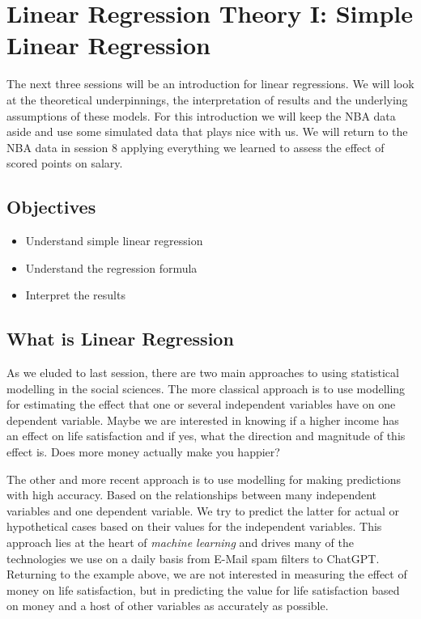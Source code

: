 \documentclass[
]{book}
\providecommand{\tightlist}{%
  \setlength{\itemsep}{0pt}\setlength{\parskip}{0pt}}
\begin{document}
\hypertarget{lin-t-1}{%
\chapter{Linear Regression Theory I: Simple Linear Regression}\label{lin-t-1}}

The next three sessions will be an introduction for linear regressions.
We will look at the theoretical underpinnings, the interpretation of results
and the underlying assumptions of these models. For this introduction we will
keep the NBA data aside and use some simulated data that plays nice with us.
We will return to the NBA data in session 8 applying everything we
learned to assess the effect of scored points on salary.

\hypertarget{objectives-2}{%
\section{Objectives}\label{objectives-2}}

\begin{itemize}
\tightlist
\item
  Understand simple linear regression
\item
  Understand the regression formula
\item
  Interpret the results
\end{itemize}

\hypertarget{what-is-linear-regression}{%
\section{What is Linear Regression}\label{what-is-linear-regression}}

As we eluded to last session, there are two main approaches to using
statistical modelling in the social sciences.
The more classical approach is to use modelling for estimating the effect that
one or several independent variables have on one dependent variable. Maybe we
are interested in knowing if a higher income has an effect on life satisfaction
and if yes, what the direction and magnitude of this effect is. Does more money
actually make you happier?

The other and more recent approach is to use modelling for making predictions
with high accuracy. Based on the relationships between many independent
variables and one dependent variable. We try to predict the latter for actual
or hypothetical cases based on their values for the independent variables.
This approach lies at the heart of \emph{machine learning} and drives many of the
technologies we use on a daily basis from E-Mail spam filters to ChatGPT.
Returning to the example above, we are not interested in measuring the effect
of money on life satisfaction, but in predicting the value for life satisfaction
based on money and a host of other variables as accurately as possible.
\end{document}
